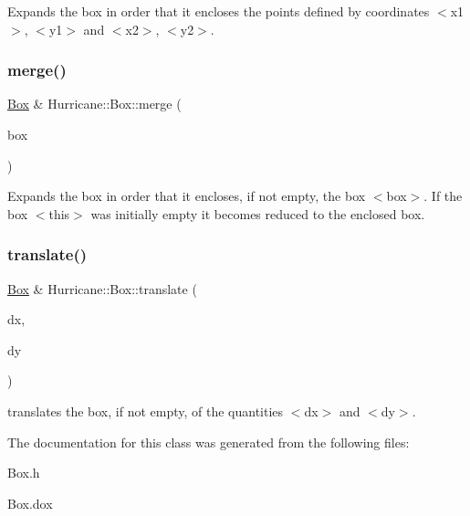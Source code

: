 Expands the box in order that it encloses the points defined by coordinates {\ttfamily $<$x1$>$}, {\ttfamily $<$y1$>$} and {\ttfamily $<$x2$>$}, {\ttfamily $<$y2$>$}. \mbox{\label{classHurricane_1_1Box_a0bdfa52a3f5f6639680ba7dbc52c21d7}} 
\subsubsection{\texorpdfstring{merge()}{merge()}\hspace{0.1cm}{\footnotesize\ttfamily [4/4]}}
{\footnotesize\ttfamily \mbox{\hyperlink{classHurricane_1_1Box}{Box}} \& Hurricane\+::\+Box\+::merge (\begin{DoxyParamCaption}\item[{const \mbox{\hyperlink{classHurricane_1_1Box}{Box}} \&}]{box }\end{DoxyParamCaption})}

Expands the box in order that it encloses, if not empty, the box {\ttfamily $<$box$>$}. If the box {\ttfamily $<$this$>$} was initially empty it becomes reduced to the enclosed box. \mbox{\label{classHurricane_1_1Box_aa689be4b37c83412f3dc95fc23c82156}} 
\subsubsection{\texorpdfstring{translate()}{translate()}}
{\footnotesize\ttfamily \mbox{\hyperlink{classHurricane_1_1Box}{Box}} \& Hurricane\+::\+Box\+::translate (\begin{DoxyParamCaption}\item[{const \mbox{\hyperlink{group__DbUGroup_ga4fbfa3e8c89347af76c9628ea06c4146}{Db\+U\+::\+Unit}} \&}]{dx,  }\item[{const \mbox{\hyperlink{group__DbUGroup_ga4fbfa3e8c89347af76c9628ea06c4146}{Db\+U\+::\+Unit}} \&}]{dy }\end{DoxyParamCaption})}

translates the box, if not empty, of the quantities {\ttfamily $<$dx$>$} and {\ttfamily $<$dy$>$}. 

The documentation for this class was generated from the following files\+:\begin{DoxyCompactItemize}
\item 
Box.\+h\item 
Box.\+dox\end{DoxyCompactItemize}
